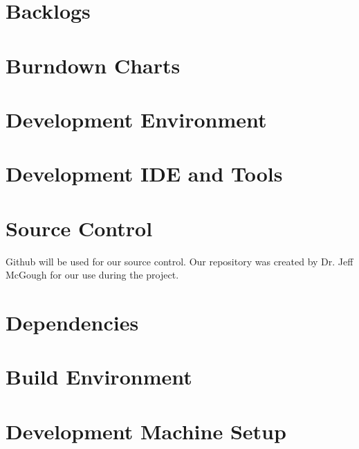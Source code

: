 \section{Backlogs}

\section{Burndown Charts}


\section{Development Environment}


\section{Development IDE and Tools}

\section{Source  Control}

Github will be used for our source control. Our repository was created by Dr. Jeff McGough for our use during the project. 

\section{Dependencies}

\section{Build  Environment}

\section{Development Machine Setup}

